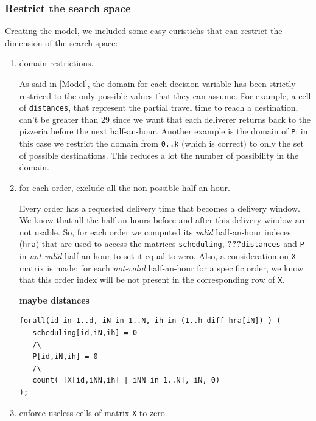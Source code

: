 \documentclass[10pt]{article}
\begin{document}
	\subsubsection{Restrict the search space}
	\label{subsubsec:restrict-search-space}
	Creating the model, we included some easy euristichs that can restrict the dimension
	of the search space:

	\begin{enumerate}

		\item domain restrictions.
		
		As said in \cref{Model}, the domain for each decision variable has been
		strictly restriced to the only possible values that they can assume. 
		For example, a cell of \texttt{distances}, that represent the partial travel time
		to reach a destination, can't be greater than 29 since we want that each deliverer 
		returns back to the pizzeria before the next half-an-hour. Another example is the domain
		of \texttt{P}: in this case we restrict the domain from \texttt{0..k} (which is correct) 
		to only the set of possible destinations. This reduces a lot the number of possibility in 
		the domain. 

		\item for each order, exclude all the non-possible half-an-hour.
		
		Every order has a requested delivery time that becomes a delivery window. 
		We know that all the half-an-hours before and after this delivery window
		are not usable. So, for each order we computed its \textit{valid} half-an-hour 
		indeces (\texttt{hra}) that are used to access the matrices \texttt{scheduling}, \textbf{???}\texttt{distances} 
		and \texttt{P} in \textit{not-valid} half-an-hour to set it equal to zero.   
		Also, a consideration on \texttt{X} matrix is made: for each \textit{not-valid} 
		half-an-hour for a specific order, we know that this order index will be not present
		in the corresponding row of \texttt{X}.

		\textbf{maybe distances}

		\begin{verbatim}
forall(id in 1..d, iN in 1..N, ih in (1..h diff hra[iN]) ) (
   scheduling[id,iN,ih] = 0
   /\
   P[id,iN,ih] = 0
   /\
   count( [X[id,iNN,ih] | iNN in 1..N], iN, 0)
);
		\end{verbatim}

		\item enforce useless cells of matrix \texttt{X} to zero.
		

\end{enumerate}
\end{document}
